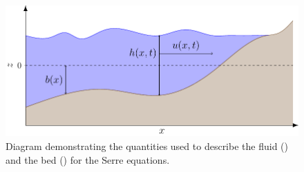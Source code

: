 \begin{figure}
	\centering
	\includegraphics[width=\textwidth]{./chp2/figures/SerreModel.pdf}
	\caption{Diagram demonstrating the quantities used to describe the fluid () and the bed () for the Serre equations.}
	\label{fig:WaterModel}
\end{figure}

